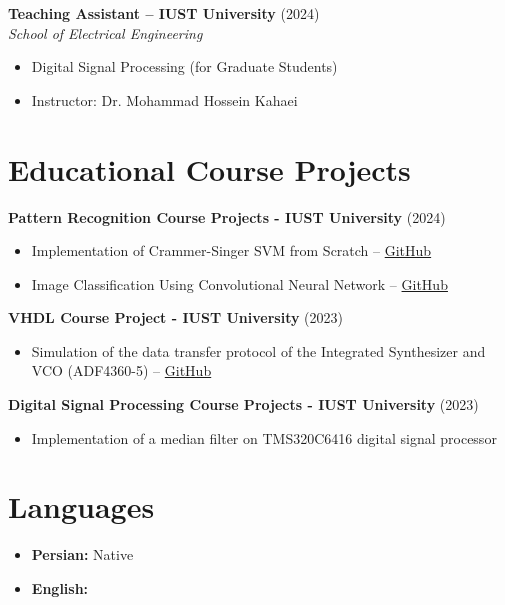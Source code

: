 \documentclass[10pt,a4paper]{article}
\begin{document}
	\vspace{8pt}
	
	\textbf{Teaching Assistant -- IUST University} \hfill (2024) \\
	\textit{School of Electrical Engineering}
	\begin{itemize}
		\item Digital Signal Processing (for Graduate Students)
		\item Instructor: Dr. Mohammad Hossein Kahaei
	\end{itemize}
	
	\section{Educational Course Projects}
	
	\textbf{Pattern Recognition Course Projects - IUST University} \hfill (2024)
	\begin{itemize}
		\item Implementation of Crammer-Singer SVM from Scratch -- \href{https://github.com/BehdadSDP/CrammerSinger_SVM}{GitHub}
		\item Image Classification Using Convolutional Neural Network -- \href{https://github.com/BehdadSDP/pc_03_CNN}{GitHub}
	\end{itemize}
	
	\vspace{8pt}
	
	\textbf{VHDL Course Project - IUST University} \hfill (2023)
	\begin{itemize}
		\item Simulation of the data transfer protocol of the Integrated Synthesizer and VCO (ADF4360-5) -- \href{https://github.com/BehdadSDP/401611184_Project_File}{GitHub}
	\end{itemize}
	
	\vspace{8pt}
	
	\textbf{Digital Signal Processing Course Projects - IUST University} \hfill (2023)
	\begin{itemize}
		\item Implementation of a median filter on TMS320C6416 digital signal processor
	\end{itemize}
		\section{Languages}
	
	\begin{itemize}
		\item \textbf{Persian:} Native
		\item \textbf{English:} 
	\end{itemize}
	
\end{document}
